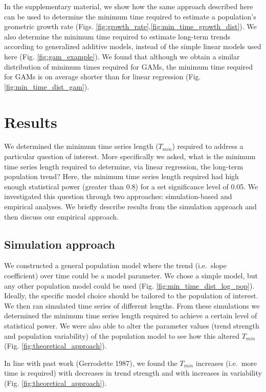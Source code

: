 \documentclass[12pt,]{article}
\begin{document}
In the supplementary material, we show how the same approach described
here can be used to determine the minimum time required to estimate a
population's geometric growth rate (Figs.
\ref{fig:growth_rate},\ref{fig:min_time_growth_dist}). We also determine
the minimum time required to estimate long-term trends according to
generalized additive models, instead of the simple linear models used
here (Fig. \ref{fig:gam_example}). We found that although we obtain a
similar distribution of minimum times required for GAMs, the minimum
time required for GAMs is on average shorter than for linear regression
(Fig. \ref{fig:min_time_dist_gam}).

\section{Results}\label{results}

We determined the minimum time series length (\(T_{min}\)) required to
address a particular question of interest. More specifically we asked,
what is the minimum time series length required to determine, via linear
regression, the long-term population trend? Here, the minimum time
series length required had high enough statistical power (greater than
0.8) for a set significance level of 0.05. We investigated this question
through two approaches: simulation-based and empirical analyses. We
briefly describe results from the simulation approach and then discuss
our empirical approach.

\subsection{Simulation approach}\label{simulation-approach-1}

We constructed a general population model where the trend (i.e.~slope
coefficient) over time could be a model parameter. We chose a simple
model, but any other population model could be used (Fig.
\ref{fig:min_time_dist_log_pop}). Ideally, the specific model choice
should be tailored to the population of interest. We then ran simulated
time series of different lengths. From these simulations we determined
the minimum time series length required to achieve a certain level of
statistical power. We were also able to alter the parameter values
(trend strength and population variability) of the population model to
see how this altered \(T_{min}\) (Fig. \ref{fig:theoretical_approach}).

In line with past work (Gerrodette 1987), we found the \(T_{min}\)
increases (i.e.~more time is required) with decreases in trend strength
and with increases in variability (Fig. \ref{fig:theoretical_approach}).
\end{document}
